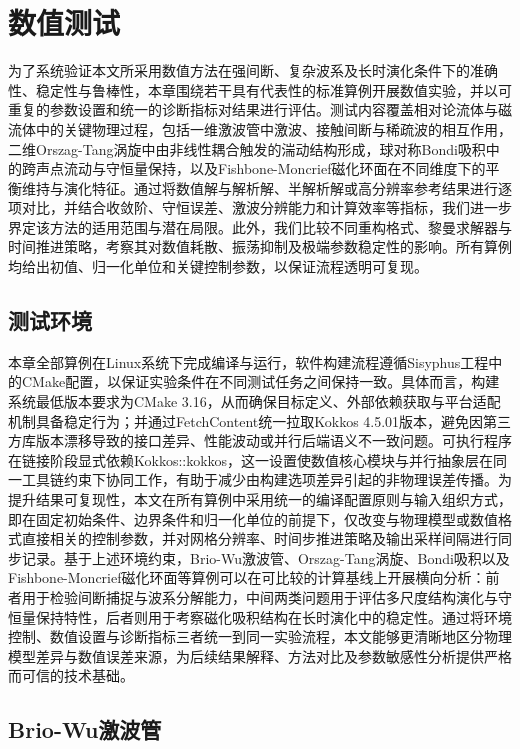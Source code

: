 \chapter{数值测试}

为了系统验证本文所采用数值方法在强间断、复杂波系及长时演化条件下的准确性、稳定性与鲁棒性，本章围绕若干具有代表性的标准算例开展数值实验，并以可重复的参数设置和统一的诊断指标对结果进行评估。测试内容覆盖相对论流体与磁流体中的关键物理过程，包括一维激波管中激波、接触间断与稀疏波的相互作用，二维Orszag-Tang涡旋中由非线性耦合触发的湍动结构形成，球对称Bondi吸积中的跨声点流动与守恒量保持，以及Fishbone-Moncrief磁化环面在不同维度下的平衡维持与演化特征。通过将数值解与解析解、半解析解或高分辨率参考结果进行逐项对比，并结合收敛阶、守恒误差、激波分辨能力和计算效率等指标，我们进一步界定该方法的适用范围与潜在局限。此外，我们比较不同重构格式、黎曼求解器与时间推进策略，考察其对数值耗散、振荡抑制及极端参数稳定性的影响。所有算例均给出初值、归一化单位和关键控制参数，以保证流程透明可复现。

\section{测试环境}

本章全部算例在Linux系统下完成编译与运行，软件构建流程遵循Sisyphus工程中的CMake配置，以保证实验条件在不同测试任务之间保持一致。具体而言，构建系统最低版本要求为CMake 3.16，从而确保目标定义、外部依赖获取与平台适配机制具备稳定行为；并通过FetchContent统一拉取Kokkos 4.5.01版本，避免因第三方库版本漂移导致的接口差异、性能波动或并行后端语义不一致问题。可执行程序在链接阶段显式依赖Kokkos::kokkos，这一设置使数值核心模块与并行抽象层在同一工具链约束下协同工作，有助于减少由构建选项差异引起的非物理误差传播。为提升结果可复现性，本文在所有算例中采用统一的编译配置原则与输入组织方式，即在固定初始条件、边界条件和归一化单位的前提下，仅改变与物理模型或数值格式直接相关的控制参数，并对网格分辨率、时间步推进策略及输出采样间隔进行同步记录。基于上述环境约束，Brio-Wu激波管、Orszag-Tang涡旋、Bondi吸积以及Fishbone-Moncrief磁化环面等算例可以在可比较的计算基线上开展横向分析：前者用于检验间断捕捉与波系分解能力，中间两类问题用于评估多尺度结构演化与守恒量保持特性，后者则用于考察磁化吸积结构在长时演化中的稳定性。通过将环境控制、数值设置与诊断指标三者统一到同一实验流程，本文能够更清晰地区分物理模型差异与数值误差来源，为后续结果解释、方法对比及参数敏感性分析提供严格而可信的技术基础。

\section{Brio-Wu激波管}
